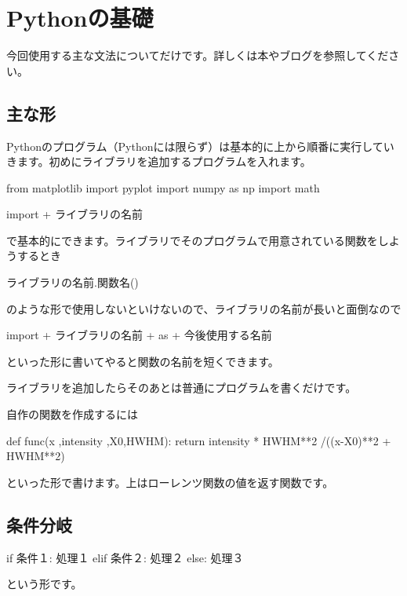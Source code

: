 \documentclass[11pt,b5paper,papersize,dvipdfmx]{jsbook}
\begin{document}
%
\section{Pythonの基礎}
今回使用する主な文法についてだけです。詳しくは本やブログを参照してください。

%
\subsection{主な形}
Pythonのプログラム（Pythonには限らず）は基本的に上から順番に実行していきます。初めにライブラリを追加するプログラムを入れます。
\begin{kdncode-ii}
    from matplotlib import pyplot
    import numpy as np
    import math
\end{kdncode-ii}
\begin{kdncode-i}
    import + ライブラリの名前
\end{kdncode-i}
で基本的にできます。ライブラリでそのプログラムで用意されている関数をしようするとき
\begin{kdncode-i}
    ライブラリの名前.関数名()
\end{kdncode-i}
のような形で使用しないといけないので、ライブラリの名前が長いと面倒なので
\begin{kdncode-i}
    import + ライブラリの名前 + as + 今後使用する名前
\end{kdncode-i}
といった形に書いてやると関数の名前を短くできます。\par
ライブラリを追加したらそのあとは普通にプログラムを書くだけです。\par
自作の関数を作成するには
\begin{kdncode-ii}
    def func(x ,intensity ,X0,HWHM):
        return intensity * HWHM**2 /((x-X0)**2 + HWHM**2)
\end{kdncode-ii}
といった形で書けます。上はローレンツ関数の値を返す関数です。

%
\subsection{条件分岐}
\begin{kdncode-ii}
    if 条件１:
        処理１
    elif 条件２:
        処理２
    else:
        処理３    
\end{kdncode-ii}
という形です。

%
\end{document}
